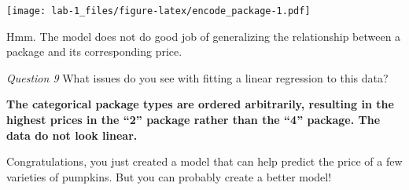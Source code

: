 \documentclass[
]{article}
\begin{document}
\texttt{[image: lab-1\_files/figure-latex/encode\_package-1.pdf]}

Hmm. The model does not do good job of generalizing the relationship
between a package and its corresponding price.

\emph{Question 9} What issues do you see with fitting a linear
regression to this data?

\textbf{The categorical package types are ordered arbitrarily, resulting
in the highest prices in the ``2'' package rather than the ``4''
package. The data do not look linear.}

Congratulations, you just created a model that can help predict the
price of a few varieties of pumpkins. But you can probably create a
better model!
\end{document}
